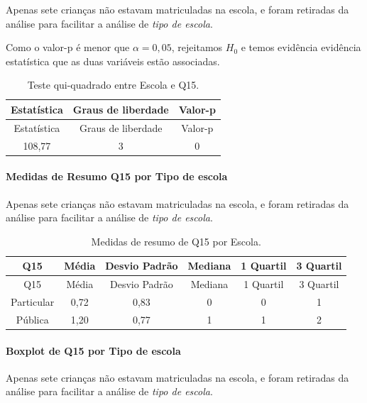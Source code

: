 \documentclass[]{article}
\let\oldparagraph\paragraph
\renewcommand{\paragraph}[1]{\oldparagraph{#1}\mbox{}}
\begin{document}
Apenas sete crianças não estavam matriculadas na escola, e foram retiradas da análise para facilitar a análise de \emph{tipo de escola}.

Como o valor-p é menor que \(\alpha=0,05\), rejeitamos \(H_0\) e temos evidência evidência estatística que as duas variáveis estão associadas.

\begin{longtable}[]{@{}ccc@{}}
\caption{\label{tab:unnamed-chunk-128}Teste qui-quadrado entre Escola e Q15.}\tabularnewline
\toprule
Estatística & Graus de liberdade & Valor-p\tabularnewline
\midrule
\endfirsthead
\toprule
Estatística & Graus de liberdade & Valor-p\tabularnewline
\midrule
\endhead
108,77 & 3 & 0\tabularnewline
\bottomrule
\end{longtable}

\cleardoublepage

\hypertarget{medidas-de-resumo-q15-por-tipo-de-escola}{%
\paragraph{Medidas de Resumo Q15 por Tipo de escola}\label{medidas-de-resumo-q15-por-tipo-de-escola}}

Apenas sete crianças não estavam matriculadas na escola, e foram retiradas da análise para facilitar a análise de \emph{tipo de escola}.

\begin{longtable}[]{@{}cccccc@{}}
\caption{\label{tab:unnamed-chunk-129}Medidas de resumo de Q15 por Escola.}\tabularnewline
\toprule
Q15 & Média & Desvio Padrão & Mediana & 1 Quartil & 3 Quartil\tabularnewline
\midrule
\endfirsthead
\toprule
Q15 & Média & Desvio Padrão & Mediana & 1 Quartil & 3 Quartil\tabularnewline
\midrule
\endhead
Particular & 0,72 & 0,83 & 0 & 0 & 1\tabularnewline
Pública & 1,20 & 0,77 & 1 & 1 & 2\tabularnewline
\bottomrule
\end{longtable}

\hypertarget{boxplot-de-q15-por-tipo-de-escola}{%
\paragraph{Boxplot de Q15 por Tipo de escola}\label{boxplot-de-q15-por-tipo-de-escola}}

Apenas sete crianças não estavam matriculadas na escola, e foram retiradas da análise para facilitar a análise de \emph{tipo de escola}.
\end{document}
